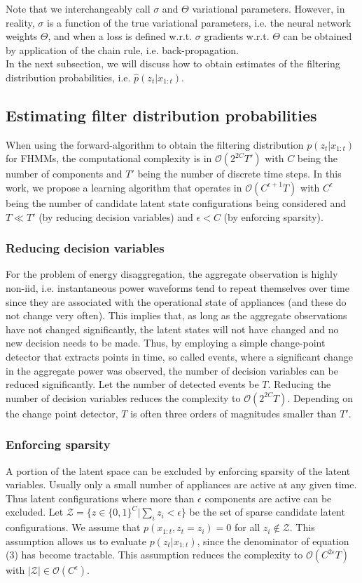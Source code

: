 Note that we interchangeably call $\sigma$ and $\Theta$ variational parameters. However, in reality, $\sigma$ is a function of the true variational parameters, i.e. the neural network weights $\Theta$, and when a loss is defined w.r.t. $\sigma$ gradients w.r.t. $\Theta$ can be obtained by application of the chain rule, i.e. back-propagation.\\
In the next subsection, we will discuss how to obtain estimates of the filtering distribution probabilities, i.e. $\hat{p}(z_t|x_{1:t})$.

\subsection{Estimating filter distribution probabilities}
\label{sec:esti}
When using the forward-algorithm to obtain the filtering distribution $p(z_{t}|x_{1:t})$ for FHMMs, the computational complexity is in $\mathcal{O}(2^{2C}T')$ with $C$ being the number of components and $T'$ being the number of discrete time steps. In this work, we propose a learning algorithm that operates in $\mathcal{O}(C^{\epsilon+1}T)$ with $C^\epsilon$ being the number of candidate latent state configurations being considered and $T \ll T'$ (by reducing decision variables) and $\epsilon < C$ (by enforcing sparsity).
\subsubsection{Reducing decision variables}
For the problem of energy disaggregation, the aggregate observation is highly non-iid, i.e. instantaneous power waveforms tend to repeat themselves over time since they are associated with the operational state of appliances (and these do not change very often). This implies that, as long as the aggregate observations have not changed significantly, the latent states will not have changed and no new decision needs to be made. Thus, by employing a simple change-point detector that extracts points in time, so called events, where a significant change in the aggregate power was observed, the number of decision variables can be reduced significantly. Let the number of detected events be $T$. Reducing the number of decision variables reduces the complexity to $\mathcal{O}(2^{2C}T)$. Depending on the change point detector, $T$ is often three orders of magnitudes smaller than $T'$.

\subsubsection{Enforcing sparsity}
A portion of the latent space can be excluded by enforcing sparsity of the latent variables. Usually only a small number of appliances are active at any given time. Thus latent configurations where more than $\epsilon$ components are active can be excluded. Let $\mathcal{Z} = \{z \in \{0,1\}^C|\sum_i z_i < \epsilon \}$ be the set of sparse candidate latent configurations. We assume that $p(x_{1:t}, z_t = z_i) = 0$ for all $z_i \notin \mathcal{Z}$. This assumption allows us to evaluate $p(z_t|x_{1:t})$, since the denominator of equation (3) has become tractable. This assumption reduces the complexity to $\mathcal{O}(C^{2\epsilon}T)$ with $|\mathcal{Z}| \in \mathcal{O}(C^{\epsilon})$.

